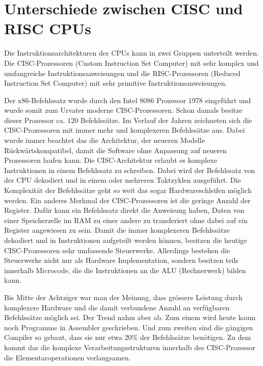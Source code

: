\section{Unterschiede zwischen CISC und RISC CPUs}

Die Instruktionsarchitekturen der CPUs kann in zwei Gruppen unterteilt werden. Die CISC-Prozessoren (Custom Instruction Set Computer) mit sehr komplex und umfangreiche Instruktionsanweisungen und die RISC-Prozessoren (Reduced Instruction Set Computer) mit sehr primitive Instruktionsanweisungen.
\par
Der x86-Befehlssatz wurde durch den Intel 8086 Prozessor 1978 eingeführt und wurde somit zum Urvater moderne CISC-Prozessoren. Schon damals besitze dieser Prozessor ca. 120 Befehlssätze. Im Verlauf der Jahren zeichneten sich die CISC-Prozessoren mit immer mehr und komplexeren Befehlssätze aus. Dabei wurde immer beachtet das die Architektur, der neueren Modelle Rückwärtskompatibel, damit die Software ohne Anpassung auf neueren Prozessoren laufen kann. Die CISC-Architektur erlaubt es komplexe Instruktionen in einem Befehlssatz zu schreiben. Dabei wird der Befehlssatz von der CPU dekodiert und in einem oder mehreren Taktzyklen ausgeführt. Die Komplexität der Befehlssätze geht so weit das sogar Hardwareschleifen möglich werden. Ein anderes Merkmal der CISC-Prozessoren ist die geringe Anzahl der Register. Dafür kann ein Befehlssatz direkt die Anweisung haben, Daten von einer Speicherzelle im RAM zu einer andere zu transferiert ohne dabei auf ein Register angewiesen zu sein. Damit die immer komplexeren Befehlssätze dekodiert und in Instruktionen aufgeteilt werden können, besitzen die heutige CISC-Prozessoren sehr umfassende Steuerwerke. Allerdings bestehen die Steuerwerke nicht nur als Hardware Implementation, sondern besitzen teils innerhalb Microcode, die die Instruktionen an die ALU (Rechnerwerk) bilden kann.
\par
Bis Mitte der Achtziger war man der Meinung, dass grössere Leistung durch komplexere Hardware und die damit verbundene Anzahl an verfügbaren Befehlssätze möglich sei. Der Trend nahm aber ab. Zum einem wird heute kaum noch Programme in Assembler geschrieben. Und zum zweiten sind die gängigen Compiler so gebaut, dass sie nur etwa 20\% der Befehlssätze benötigen. Zu dem kommt das die komplexe Verarbeitungsstrukturen innerhalb des CISC-Prozessor die Elementaroperationen verlangsamen.
\par
